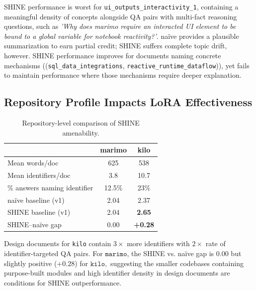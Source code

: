 \documentclass[conference,10.5pt]{IEEEtran}
\begin{document}
SHINE performance is worst for \texttt{ui\_outputs\_interactivity\_1}, containing a meaningful density of concepts alongside QA pairs with multi-fact reasoning questions, such as \textit{'Why does marimo require an interacted UI element to be bound to a global variable for notebook reactivity?'}. naïve provides a plausible summarization to earn partial credit; SHINE suffers complete topic drift, however. SHINE performance improves for documents naming concrete mechanisms ((\texttt{sql\_data\_integrations}, \texttt{reactive\_runtime\_dataflow})), yet fails to maintain performance where those mechanisms require deeper explanation. 

\subsection{Repository Profile Impacts LoRA Effectiveness}

\begin{table}[h]
\centering
\caption{Repository-level comparison of SHINE amenability.}
\label{tab:repo-profile}
\begin{tabular}{lcc}
\toprule
& \textbf{marimo} & \textbf{kilo} \\
\midrule
Mean words/doc               & 625   & 538   \\
Mean identifiers/doc         & 3.8   & 10.7  \\
\% answers naming identifier & 12.5\% & 23\% \\
naïve baseline (v1)          & 2.04  & 2.37  \\
SHINE baseline (v1)          & 2.04  & \textbf{2.65} \\
SHINE--naïve gap             & 0.00  & \textbf{+0.28} \\
\bottomrule
\end{tabular}
\end{table}

Design documents for \texttt{kilo} contain $3\times $ more identifiers with $2\times$ rate of identifier-targeted QA pairs. For $\texttt{marimo}$, the SHINE vs. naïve gap is $0.00$ but slightly positive ($+0.28$) for $\texttt{kilo},$ suggesting the smaller codebases containing purpose-built modules and high identifier density in design documents are conditions for SHINE outperformance. 
\end{document}
